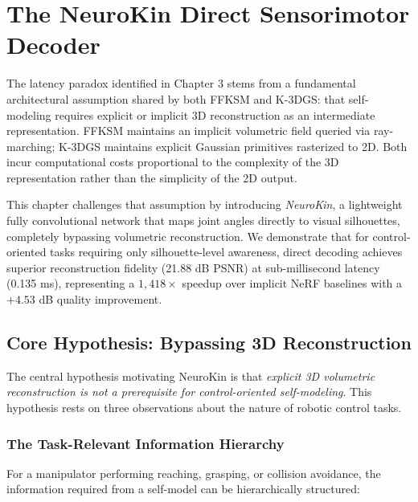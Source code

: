\documentclass[12pt,a4paper,oneside]{report}
\begin{document}
\clearpage

\chapter{The NeuroKin Direct Sensorimotor Decoder}

The latency paradox identified in Chapter 3 stems from a fundamental architectural assumption shared by both FFKSM and K-3DGS: that self-modeling requires explicit or implicit 3D reconstruction as an intermediate representation. FFKSM maintains an implicit volumetric field queried via ray-marching; K-3DGS maintains explicit Gaussian primitives rasterized to 2D. Both incur computational costs proportional to the complexity of the 3D representation rather than the simplicity of the 2D output.

This chapter challenges that assumption by introducing \textit{NeuroKin}, a lightweight fully convolutional network that maps joint angles directly to visual silhouettes, completely bypassing volumetric reconstruction. We demonstrate that for control-oriented tasks requiring only silhouette-level awareness, direct decoding achieves superior reconstruction fidelity (21.88 dB PSNR) at sub-millisecond latency (0.135 ms), representing a $1,418\times$ speedup over implicit NeRF baselines with a $+4.53$ dB quality improvement.

\section{Core Hypothesis: Bypassing 3D Reconstruction}

The central hypothesis motivating NeuroKin is that \textit{explicit 3D volumetric reconstruction is not a prerequisite for control-oriented self-modeling}. This hypothesis rests on three observations about the nature of robotic control tasks.

\subsection{The Task-Relevant Information Hierarchy}

For a manipulator performing reaching, grasping, or collision avoidance, the information required from a self-model can be hierarchically structured:
\end{document}
